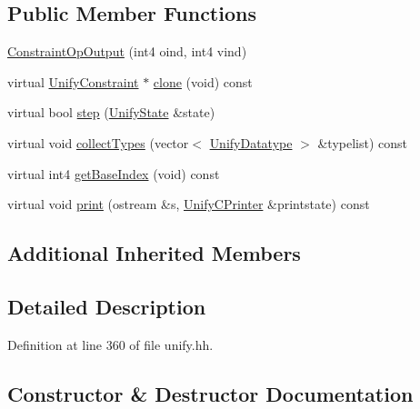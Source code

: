 \subsection*{Public Member Functions}
\begin{DoxyCompactItemize}
\item 
\mbox{\hyperlink{class_constraint_op_output_a1b7658d327e2bf08bd8c6c2b74b43bef}{Constraint\+Op\+Output}} (int4 oind, int4 vind)
\item 
virtual \mbox{\hyperlink{class_unify_constraint}{Unify\+Constraint}} $\ast$ \mbox{\hyperlink{class_constraint_op_output_a1545d669aef376aab9cd317c19e47fb7}{clone}} (void) const
\item 
virtual bool \mbox{\hyperlink{class_constraint_op_output_aec6f2bec6b741072d41d44edb4308aa3}{step}} (\mbox{\hyperlink{class_unify_state}{Unify\+State}} \&state)
\item 
virtual void \mbox{\hyperlink{class_constraint_op_output_ac1f237a686a53fd03a9eafc95ca9ece0}{collect\+Types}} (vector$<$ \mbox{\hyperlink{class_unify_datatype}{Unify\+Datatype}} $>$ \&typelist) const
\item 
virtual int4 \mbox{\hyperlink{class_constraint_op_output_a89fa1174c3aca274c05f8f623bd63367}{get\+Base\+Index}} (void) const
\item 
virtual void \mbox{\hyperlink{class_constraint_op_output_ab4486f3c60de93d81556e3283c38989c}{print}} (ostream \&s, \mbox{\hyperlink{class_unify_c_printer}{Unify\+C\+Printer}} \&printstate) const
\end{DoxyCompactItemize}
\subsection*{Additional Inherited Members}


\subsection{Detailed Description}


Definition at line 360 of file unify.\+hh.



\subsection{Constructor \& Destructor Documentation}
\mbox{\label{class_constraint_op_output_a1b7658d327e2bf08bd8c6c2b74b43bef}} 
